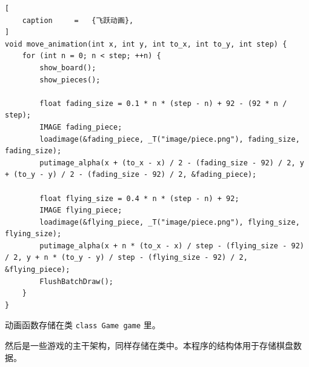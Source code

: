 \documentclass[12pt,a4paper,twoside]{ctexart}
\numberwithin{figure}{section}
\numberwithin{equation}{section}
\begin{document}
\begin{lstlisting}[
    caption     =   {飞跃动画},
]
void move_animation(int x, int y, int to_x, int to_y, int step) {
    for (int n = 0; n < step; ++n) {
        show_board();
        show_pieces();

        float fading_size = 0.1 * n * (step - n) + 92 - (92 * n / step);
        IMAGE fading_piece;
        loadimage(&fading_piece, _T("image/piece.png"), fading_size, fading_size);
        putimage_alpha(x + (to_x - x) / 2 - (fading_size - 92) / 2, y + (to_y - y) / 2 - (fading_size - 92) / 2, &fading_piece);

        float flying_size = 0.4 * n * (step - n) + 92;
        IMAGE flying_piece;
        loadimage(&flying_piece, _T("image/piece.png"), flying_size, flying_size);
        putimage_alpha(x + n * (to_x - x) / step - (flying_size - 92) / 2, y + n * (to_y - y) / step - (flying_size - 92) / 2, &flying_piece);
        FlushBatchDraw();
    }
}
\end{lstlisting}

动画函数存储在类 \verb|class Game game| 里。

然后是一些游戏的主干架构，同样存储在类中。本程序的结构体用于存储棋盘数据。
\end{document}
